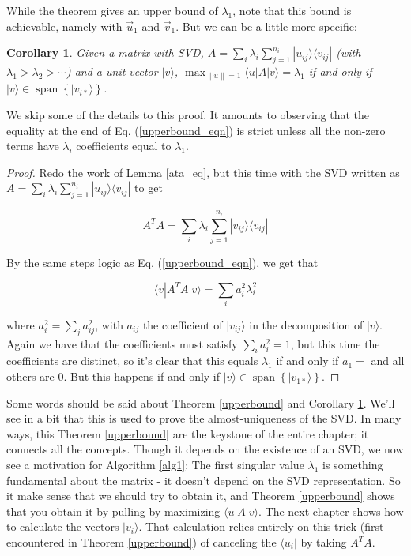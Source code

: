 \documentclass{amsbook}
\newtheorem{corollary}[theorem]{Corollary}
\begin{document}
While the theorem gives an upper bound of $\lambda_1$, note that this bound is achievable, namely with $\vec u_1$ and $\vec v_1$.  But we can be a little more specific:

\begin{corollary}
\label{corollary1}
Given a matrix with SVD, $A=\sum_i\lambda_i\sum_{j=1}^{n_i}|u_{ij}\rangle\langle v_{ij}|$ (with $\lambda_1>\lambda_2>\cdots$) and a unit vector $|v\rangle$, $\max_{\|u\|=1}\langle u|A|v\rangle=\lambda_1$ if and only if $|v\rangle\in\operatorname{span}\left\{|v_{i*}\rangle\right\}$.
\end{corollary}

We skip some of the details to this proof.  It amounts to observing that the equality at the end of Eq. (\ref{upperbound_eqn}) is strict unless all the non-zero terms have $\lambda_i$ coefficients equal to $\lambda_1$.

\begin{proof}
Redo the work of Lemma \ref{ata_eq}, but this time with the SVD written as $A=\sum_i\lambda_i\sum_{j=1}^{n_i}|u_{ij}\rangle\langle v_{ij}|$ to get

$$
A^TA=\sum_i\lambda_i\sum_{j=1}^{n_i}|v_{ij}\rangle\langle v_{ij}|
$$

By the same steps logic as Eq. (\ref{upperbound_eqn}), we get that

$$
\langle v|A^TA|v\rangle = \sum_ia_i^2\lambda_i^2
$$

where $a_i^2=\sum_ja_{ij}^2$, with $a_{ij}$ the coefficient of $|v_{ij}\rangle$ in the decomposition of $|v\rangle$.  Again we have that the coefficients must satisfy $\sum_ia_i^2=1$, but this time the coefficients are distinct, so it's clear that this equals $\lambda_1$ if and only if $a_1=$ and all others are $0$.  But this happens if and only if $|v\rangle\in\operatorname{span}\left\{|v_{1*}\rangle\right\}$.

\end{proof}

Some words should be said about Theorem \ref{upperbound} and Corollary \ref{corollary1}.  We'll see in a bit that this is used to prove the almost-uniqueness of the SVD.  In many ways, this Theorem \ref{upperbound} are the keystone of the entire chapter; it connects all the concepts.  Though it depends on the existence of an SVD, we now see a motivation for Algorithm \ref{alg1}:  The first singular value $\lambda_1$ is something fundamental about the matrix - it doesn't depend on the SVD representation.  So it make sense that we should try to obtain it, and Theorem \ref{upperbound} shows that you obtain it by pulling by maximizing $\langle u|A|v\rangle$.  The next chapter shows how to calculate the vectors $|v_i\rangle$.  That calculation relies entirely on this trick (first encountered in Theorem \ref{upperbound}) of canceling the $\langle u_i|$ by taking $A^TA$.
\end{document}
